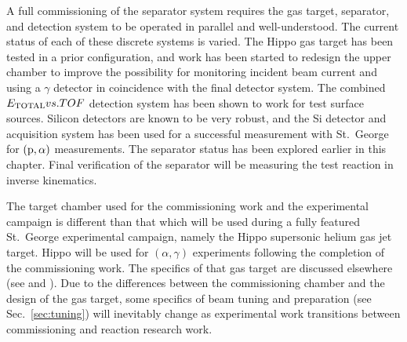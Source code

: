 A full commissioning of the separator system requires the gas target,
separator, and detection system to be operated in parallel and
well-understood. The current status of each of these discrete systems is
varied. The Hippo gas target has been tested in a prior configuration,
and work has been started to redesign the upper chamber to improve the
possibility for monitoring incident beam current and using a $\gamma$
detector in coincidence with the final detector system. The combined
$E_{\rm{TOTAL}} vs. TOF$ detection system has been shown to work for
test surface sources. Silicon detectors are known to be very robust, and
the Si detector and acquisition system has been used for a successful
measurement with St.\ George for $(\rm{p},\alpha)$ measurements. The
separator status has been explored earlier in this chapter. Final
verification of the separator will be measuring the test reaction
 in inverse
kinematics.

The target chamber used for the commissioning work and the experimental
campaign is different than that which will be used during a fully
featured St.\ George experimental campaign, namely the Hippo supersonic
helium gas jet target. Hippo will be used for $(\alpha,\gamma)$
experiments following the completion of the commissioning work. The
specifics of that gas target are discussed elsewhere (see
\cite{Kontos2012} and \cite{Meisel2016}). Due to the differences between
the commissioning chamber and the design of the gas target, some
specifics of beam tuning and preparation (see Sec.~\ref{sec:tuning})
will inevitably change as experimental work transitions between
commissioning and reaction research work.
